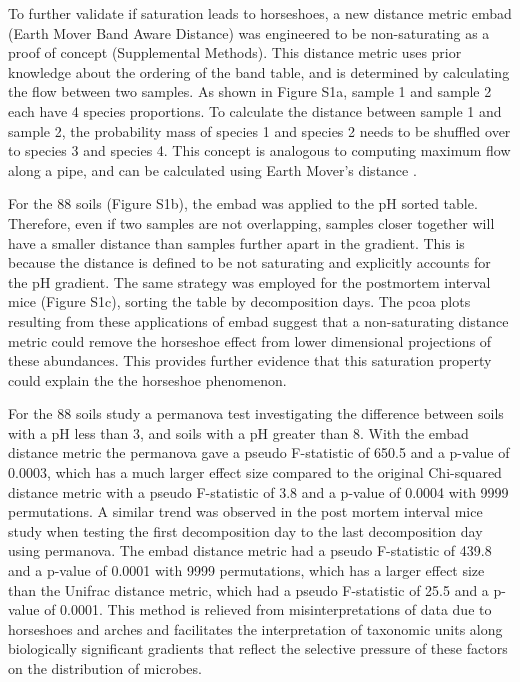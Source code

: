 To further validate if saturation leads to horseshoes, a new distance metric \gls{embad} (Earth Mover Band Aware Distance) was engineered to be non-saturating as a proof of concept (Supplemental Methods).  This distance metric uses prior knowledge about the ordering of the band table, and is determined by calculating the flow between two samples. As shown in Figure S1a, sample 1 and sample 2 each have 4 species proportions.  To calculate the distance between sample 1 and sample 2, the probability mass of species 1 and species 2 needs to be shuffled over to species 3 and species 4.  This concept is analogous to computing maximum flow along a pipe, and can be calculated using Earth Mover's distance \cite{emd, unifrac_emd, unifrac}.\par
For the 88 soils (Figure S1b), the \gls{embad} was applied to the pH sorted table. Therefore, even if two samples are not overlapping, samples closer together will have a smaller distance than samples further apart in the gradient.  This is because the distance is defined to be not saturating and explicitly accounts for the pH gradient.  The same strategy was employed for the postmortem interval mice (Figure S1c), sorting the table by decomposition days. The \gls{pcoa} plots resulting from these applications of \gls{embad} suggest that a non-saturating distance metric could remove the horseshoe effect from lower dimensional projections of these abundances.  This provides further evidence that this saturation property could explain the the horseshoe phenomenon.\par
For the 88 soils study a \gls{permanova} test investigating the difference between soils with a pH less than 3, and soils with a pH greater than 8.  With the \gls{embad} distance metric the \gls{permanova} gave a pseudo F-statistic of 650.5 and a p-value of 0.0003, which has a much larger effect size compared to the original Chi-squared distance metric with a pseudo F-statistic of 3.8 and a p-value of 0.0004 with 9999 permutations.  A similar trend was observed in the post mortem interval mice study when testing the first decomposition day to the last decomposition day using \gls{permanova}.  The \gls{embad} distance metric had a pseudo F-statistic of 439.8 and a p-value of 0.0001 with 9999 permutations, which has a larger effect size than the Unifrac distance metric, which had a pseudo F-statistic of 25.5 and a p-value of 0.0001. This method is relieved from misinterpretations of data due to horseshoes and arches and facilitates the interpretation of taxonomic units along biologically significant gradients that reflect the selective pressure of these factors on the distribution of microbes.  \par
